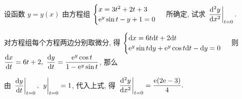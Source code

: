 \begin{example}
    设函数 $y=y(x)$ 由方程组 $\begin{cases}
            x=3t^2+2t+3 \\ \mathrm{e}^y\sin t-y+1=0
        \end{cases}$ 所确定, 试求 $\displaystyle\eval{\dv[2]{y}{x}}_{t=0}.$
\end{example}
\begin{solution}
    对方程组每个方程两边分别取微分, 得 $\begin{cases}
            \dd x=6t\dd t+2\dd t \\ \mathrm{e}^y\sin t\dd y+\mathrm{e}^y\cos t\dd t-\dd y=0
        \end{cases}$ 则 $\displaystyle\dv{x}{t}=6t+2,~\dv{y}{t}=\dfrac{\mathrm{e}^y\cos t}{1-\mathrm{e}^y\sin t}$, 那么
    由 $\displaystyle\eval{\dv{y}{t}}_{t=0},~\eval{y}_{t=0}=1$, 代入上式, 得 $\displaystyle\eval{\dv[2]{y}{x}}_{t=0}=\dfrac{\e(2\e-3)}{4}.$
\end{solution}

